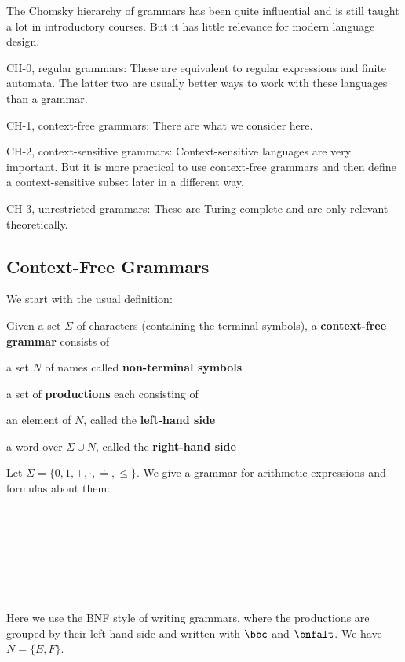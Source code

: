 \begin{remark}
The Chomsky hierarchy of grammars has been quite influential and is still taught a lot in introductory courses.
But it has little relevance for modern language design.
\begin{compactitem}
\item CH-0, regular grammars: These are equivalent to regular expressions and finite automata. The latter two are usually better ways to work with these languages than a grammar.
\item CH-1, context-free grammars: There are what we consider here.
\item CH-2, context-sensitive grammars: Context-sensitive languages are very important.
  But it is more practical to use context-free grammars and then define a context-sensitive subset later in a different way.
\item CH-3, unrestricted grammars: These are Turing-complete and are only relevant theoretically.
\end{compactitem}
\end{remark}

\subsection{Context-Free Grammars}

We start with the usual definition:

\begin{definition}
Given a set $\Sigma$ of characters (containing the terminal symbols), a \textbf{context-free grammar} consists of
\begin{compactitem}
\item a set $N$ of names called \textbf{non-terminal symbols}
\item a set of \textbf{productions} each consisting of
 \begin{compactitem}
  \item an element of $N$, called the \textbf{left-hand side}
  \item a word over $\Sigma\cup N$, called the \textbf{right-hand side}
 \end{compactitem}
\end{compactitem}
\end{definition}

\begin{example}\label{ex:cfs}
Let $\Sigma=\{0,1,+,\cdot,\doteq,\leq\}$.
We give a grammar for arithmetic expressions and formulas about them:
\begin{commgrammar}
\\
\\
\\
\\
\\
\\
\end{commgrammar}
Here we use the BNF style of writing grammars, where the productions are grouped by their left-hand side and written with $\bbc$ and $\bnfalt$.
We have $N=\{E,F\}$.
\end{example}

